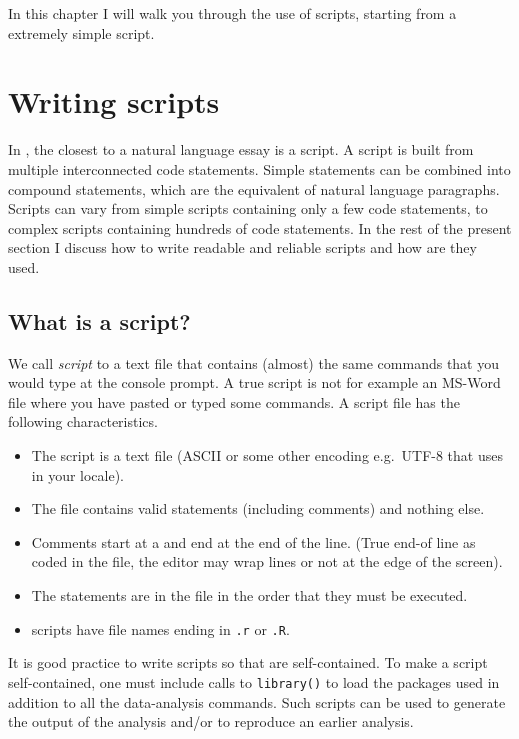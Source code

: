 \documentclass[krantz2]{krantz}\usepackage{knitr}%
\begin{document}
In this chapter I will walk you through the use of \Rpgrm scripts, starting from a extremely simple script.

\section{Writing scripts}

In \Rlang, the closest to a natural language essay is a script. A script is built from multiple interconnected code statements. Simple statements can be combined into compound statements, which are the equivalent of natural language paragraphs. Scripts can vary from simple scripts containing only a few code statements, to complex scripts containing hundreds of code statements. In the rest of the present section I discuss how to write readable and reliable scripts and how are they used.

\subsection{What is a script?}\label{sec:script:what:is}
We call \textit{script} to a text file that contains (almost) the same commands that you would type at the console prompt. A true script is not for example an MS-Word file where you have pasted or typed some \Rlang commands. A script file has the following characteristics.
\begin{itemize}
  \item The script is a text file (ASCII or some other encoding e.g.\ UTF-8 that \Rpgrm uses in your locale).
  \item The file contains valid \Rlang statements (including comments) and nothing else.
  \item Comments start at a \code{\#} and end at the end of the line. (True end-of line as coded in the file, the editor may wrap lines or not at the edge of the screen).
  \item The \Rlang statements are in the file in the order that they must be executed.
  \item \Rlang scripts have file names ending in \texttt{.r} or \texttt{.R}.
\end{itemize}

It is good practice to write scripts so that are self-contained. To make a script self-contained, one must include calls to \texttt{library()} to load the packages used in addition to all the data-analysis commands. Such scripts can be used to generate the output of the analysis and/or to reproduce an earlier analysis.
\end{document}
